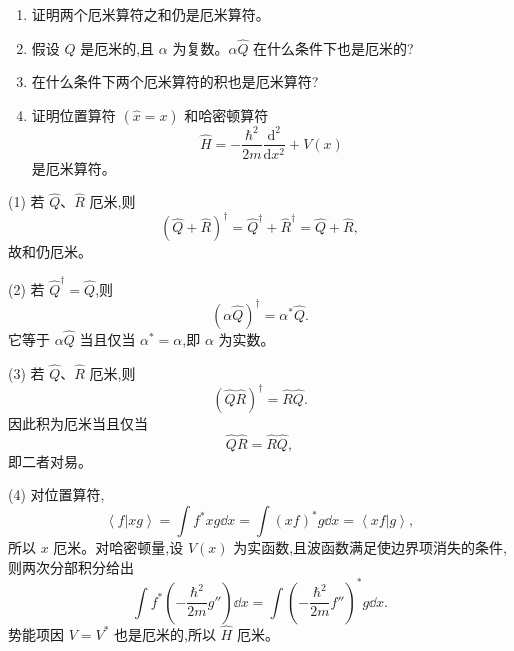 \begin{question}
\begin{enumerate}
\item 证明两个厄米算符之和仍是厄米算符。
\item 假设 $\hat Q$ 是厄米的,且 $\alpha$ 为复数。$\alpha\hat Q$ 在什么条件下也是厄米的?
\item 在什么条件下两个厄米算符的积也是厄米算符?
\item 证明位置算符 $(\hat x=x)$ 和哈密顿算符
\[
\hat H=-\frac{\hbar^2}{2m}\frac{\mathrm d^2}{\mathrm dx^2}+V(x)
\]
是厄米算符。
\end{enumerate}
\begin{solution}
(1) 若 $\hat Q$、$\hat R$ 厄米,则
\[
(\hat Q+\hat R)^\dagger=\hat Q^\dagger+\hat R^\dagger=\hat Q+\hat R,
\]
故和仍厄米。

(2) 若 $\hat Q^\dagger=\hat Q$,则
\[
(\alpha\hat Q)^\dagger=\alpha^*\hat Q.
\]
它等于 $\alpha\hat Q$ 当且仅当 $\alpha^*=\alpha$,即 $\alpha$ 为实数。

(3) 若 $\hat Q$、$\hat R$ 厄米,则
\[
(\hat Q\hat R)^\dagger=\hat R\hat Q.
\]
因此积为厄米当且仅当
\[
\hat Q\hat R=\hat R\hat Q,
\]
即二者对易。

(4) 对位置算符,
\[
\left\langle f|xg \right\rangle=\int f^*xg\dd x=\int (xf)^*g\dd x=\left\langle xf|g \right\rangle,
\]
所以 $x$ 厄米。对哈密顿量,设 $V(x)$ 为实函数,且波函数满足使边界项消失的条件,则两次分部积分给出
\[
\int f^*\left(-\frac{\hbar^2}{2m}g''\right)\dd x
=\int \left(-\frac{\hbar^2}{2m}f''\right)^*g\dd x.
\]
势能项因 $V=V^*$ 也是厄米的,所以 $\hat H$ 厄米。
\end{solution}
\end{question}


